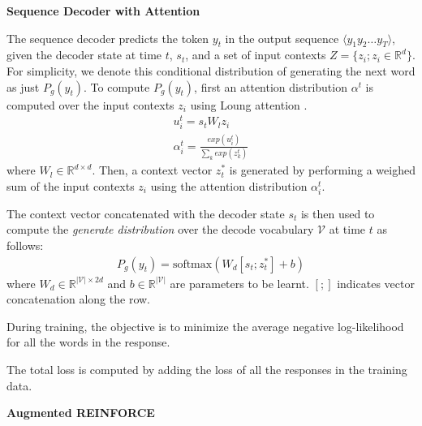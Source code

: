 \noindent\textbf{Sequence Decoder with Attention}
\label{ssec:rnndecoder}

The sequence decoder predicts the token $y_t$ in the output sequence $\langle y_1  y_2  \ldots  y_T \rangle$, given the decoder state at time $t$, $s_t$, and a set of input contexts $Z=\{z_i ; z_i \in \mathbb{R}^{d}\}$. For simplicity, we denote this conditional distribution of generating the next word as just $P_g(y_t)$. To compute $P_g(y_t)$, first an attention distribution $\alpha^t$ is computed over the input contexts $z_i$ using Loung attention \cite{luong2015effective}. 
\begin{gather}
u_i^t = s_t W_l z_i \\
\alpha_i^t = \frac{exp(u_i^t)}{\sum\nolimits_{k}exp(z_k^t)} \label{eq:memattn}
\end{gather}
where $W_l \in \mathbb{R}^{d \times d}$. Then, a context vector $z^*_t$ is generated by performing a weighed sum of the input contexts $z_i$ using the attention distribution $\alpha^t_i$.

The context vector concatenated with the decoder state $s_t$ is then used to compute the \textit{generate distribution} over the decode vocabulary $\mathcal{V}$ at time $t$ as follows:
\begin{gather}
P_{g}(y_t)= \text{softmax}( W_d [s_t;z^*_t] + b )
\end{gather}
where $W_d \in \mathbb{R}^{|\mathcal{V}| \times 2d}$ and $b \in \mathbb{R}^{|\mathcal{V}|}$ are parameters to be learnt.  $[;]$ indicates vector concatenation along the row.

During training, the objective is to minimize the average negative log-likelihood for all the words in the response.

The total loss is computed by adding the loss of all the responses in the training data.

\noindent\textbf{Augmented REINFORCE}
\label{ssec:Areinforce}

